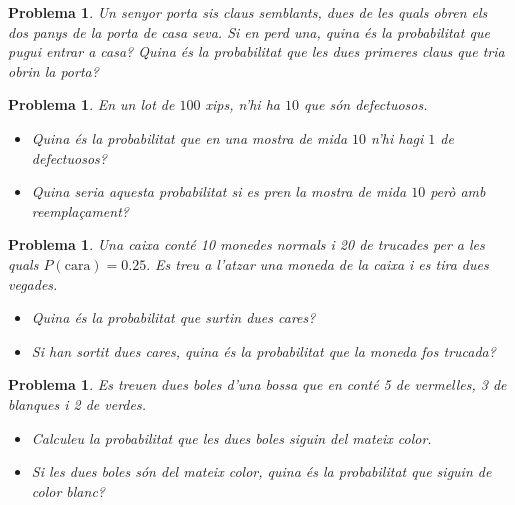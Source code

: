 \documentclass[11pt]{article}
\newcounter{prbcont}
\newtheorem{problema}[prbcont]{Problema}
\begin{document}
\begin{problema}
Un senyor porta sis claus semblants, dues de les quals obren els dos panys de la porta de casa seva. Si en perd una, quina \'es la probabilitat que pugui entrar a casa? Quina \'es la
probabilitat que les dues primeres claus que tria obrin la porta?
\end{problema}



\begin{problema}
En un lot de $100$ xips, n'hi ha $10$ que s\'on defectuosos.
\begin{itemize}
\item [(a)] Quina \'es la probabilitat que en una mostra de mida $10$ n'hi hagi $1$ de defectuosos?
\item [(b)] Quina seria aquesta probabilitat si es pren la mostra de mida $10$ per\`o amb reempla\c{c}ament?       \end{itemize}
\end{problema}


\begin{problema}
Una caixa cont\'e 10 monedes normals i 20 de trucades per a les quals $P(\text{cara}) = 0.25.$ Es
treu a l'atzar una moneda de la caixa i es tira dues vegades.
\begin{itemize}
\item [(a)] Quina \'es la probabilitat que surtin dues cares?
\item [(b)] Si han sortit dues cares, quina \'es la probabilitat que la moneda fos trucada?
\end{itemize}
\end{problema}

\begin{problema}
Es treuen dues boles d'una bossa que en cont\'e 5 de vermelles, 3 de blanques i 2 de verdes.
\begin{itemize}
\item [(a)] Calculeu la probabilitat que les dues boles siguin del mateix color.
\item [(b)] Si les dues boles s\'on del mateix color, quina \'es la probabilitat que siguin de color blanc?
\end{itemize}
\end{problema}
\end{document}
